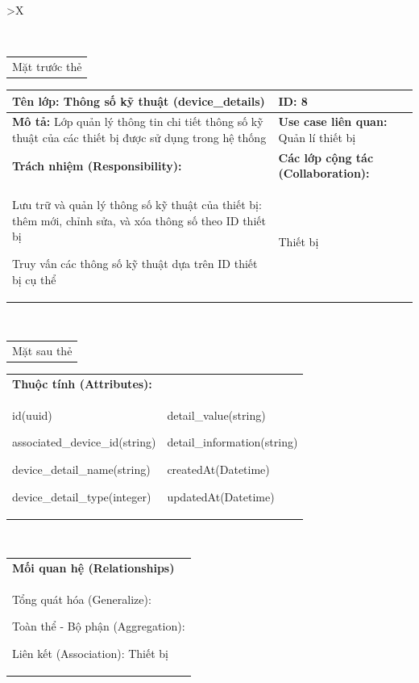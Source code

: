 \begin{xltabular}{\textwidth}{
		>{\centering\arraybackslash}X
	}
	\caption{\bfseries \fontsize{12pt}{0pt}\selectfont Thẻ CRC lớp Thông số kỹ thuật}
	\\
	\begin{tabularx}{0.9\textwidth}{X}
		Mặt trước thẻ
	\end{tabularx}
	\begin{tabularx}{0.9\textwidth}{|X|X|}
		\hline
		\textbf{Tên lớp:} Thông số kỹ thuật (device\_details)                                                         & \textbf{ID:} 8                                 \\
		\hline
		\textbf{Mô tả:} Lớp quản lý thông tin chi tiết thông số kỹ thuật của các thiết bị được sử dụng trong hệ thống & \textbf{Use case liên quan:}  Quản lí thiết bị \\
		\hline
		\textbf{Trách nhiệm (Responsibility):}                                                                        & \textbf{Các lớp cộng tác (Collaboration):}     \\
		Lưu trữ và quản lý thông số kỹ thuật của thiết bị: thêm mới, chỉnh sửa, và xóa thông số theo ID thiết bị

		Truy vấn các thông số kỹ thuật dựa trên ID thiết bị cụ thể
		                                                                                                              &
		Thiết bị
		\\
		\hline
	\end{tabularx}
	\\
	\begin{tabularx}{0.9\textwidth}{X}
		Mặt sau thẻ
	\end{tabularx}
	\begin{tabularx}{0.9\textwidth}{|X|X|}
		\hline
		\textbf{Thuộc tính (Attributes):} & \\
		id(uuid)

		associated\_device\_id(string)

		device\_detail\_name(string)

		device\_detail\_type(integer)
		                                  &
		detail\_value(string)

		detail\_information(string)

		createdAt(Datetime)

		updatedAt(Datetime)
		\\ \hline
	\end{tabularx}
	\\
	\begin{tabularx}{0.9\textwidth}{|X|}
		\hline
		\textbf{Mối quan hệ (Relationships)} \\
		Tổng quát hóa (Generalize):

		Toàn thể - Bộ phận (Aggregation):

		Liên kết (Association): Thiết bị
		\\
		\hline
	\end{tabularx}
\end{xltabular}

